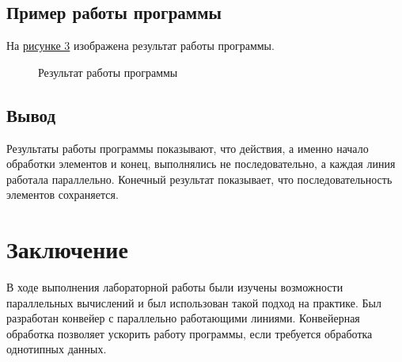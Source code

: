 \documentclass[14pt, a4paper]{extarticle}
\begin{document}
\subsection{Пример работы программы}
На \hyperref[result]{рисунке 3} изображена результат работы программы.
\begin{figure}[h!]\label{result}
	\caption{Результат работы программы}
\end{figure}
\subsection{Вывод}
Результаты работы программы показывают, что действия, а именно начало обработки элементов и конец, выполнялись не последовательно, а каждая линия работала параллельно. Конечный результат показывает, что последовательность элементов сохраняется.
\clearpage
\section{Заключение}
В ходе выполнения лабораторной работы были изучены возможности параллельных вычислений и был использован такой подход на практике. Был разработан конвейер с параллельно работающими линиями. Конвейерная обработка позволяет ускорить работу программы, если требуется обработка однотипных данных.
\clearpage
\end{document}
